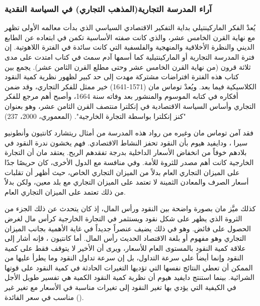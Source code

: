 \documentclass[10pt,a4paper]{report}
\begin{document}
\begin{doublespacing}
\subsubsection{آراء المدرسة التجارية(المذهب التجاري) في السياسة النقدية}
يُعدْ الفكر الماركينتيلي بداية التفكير الاقتصادي السياسي الذي بدأت معالمه الأولى تظهر مع نهاية القرن الخامس عشر، والذي كانت صفته الأساسية تكمن في ابتعاده عن الطابع الديني والنظرة الأخلاقية والمنهجية والفلسفية التي كانت سائدة في الفترة اللاهوتية. إن فترة المدرسة التجارية أو الماركينتيلية كما أسمها آدم سمث في كتاب  امتدت على مدى ثلاثة قرون (من نهاية القرن الخامس عشر وحتى مطلع القرن الثامن عشر). يجمع بين كتاب هذه الفترة افتراضات مشتركة مهدت إلى حد كبير لظهور نظرية كمية النقود الكلاسيكية فيما بعد. ويُعدْ توماس مان (1571-1641) خير ممثل للفكر التجاري، وقد ضمن أفكاره في كتابه الموسوم  والمنشور بعد وفاته سنة 1664، وأصبح أهم مرجع للفكر التجاري وأساس السياسة الاقتصادية في إنكلترا منتصف القرن الثامن عشر، وهو بعنوان "كنز إنكلترا بواسطة التجارة الخارجية". (المعموري، 2000، 237)

فقد آمن توماس مان وغيره من رواد هذه المدرسة من أمثال ريتشارد كانتيون  وأنطونيو سيرا ، ودايفيد هيوم  بأن النقود تحفز النشاط الاقتصادي. فهم يخشون ندرة النقود في بلادهم خوفاً من انخفاض الأسعار الداخلية بدرجة تفقدهم الربح. يعتقد مان أن التجارة الخارجية كانت أهم مصدر للثروة للأمة. وفي منافسة مع الدول الأخرى، كان حريصًا جدًا على الميزان التجاري العام بدلاً من الميزان التجاري الخاص، حيث أظهر أن تقلبات أسعار الصرف والمعادن الثمينة لا تعتمد على الميزان التجاري مع بلد معين، ولكن بدلاً من ذلك تعتمد على الميزان التجاري العام.

كذلك ميَّز مان بصورة واضحة بين النقود ورأس المال، إذ كان يتحدث عن ذلك الجزء من الثروة الذي يظهر على شكل نقود ويستثمر في التجارة الخارجية كرأس مال لغرض الحصول على فائض. وهو في ذلك يضيف عنصراً جديداً في غاية الأهمية بجانب الميزان التجاري وهو مفهوم  أو بلغة الاقتصاد الحديث رأس المال. أما كانتيون ، فإنه أشار إلى علاقة كمية النقود بالمستوى العام للأسعار، ويرى أن الأخير لا يتوقف فقط على كمية النقود وإنما أيضاً على سرعة التداول، بل إن سرعة تداول النقود وما يطرأ عليها من الممكن أن تعطي النتائج نفسها التي تؤديها التغيرات الحادثة في كمية النقود على قوتها الشرائية. بينما استنتج دايفيد هيوم  أن نظرية كمية النقود الكمية هي تفسير طويل الأجل في الكيفية التي يؤدي بها تغير النقود إلى تغيرات مناسبة في الأسعار مع تغير غير مناسب في سعر الفائدة (). 


\end{doublespacing}
\end{document}

